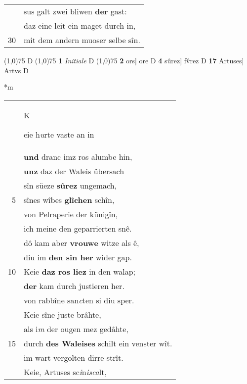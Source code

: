 \documentclass[8pt,a4paper,notitlepage]{article}
\begin{document}
\begin{table}[ht]
\begin{minipage}[t]{0.5\linewidth}
\begin{tabular}{rl}
 & sus galt zwei bliwen \textbf{der} gast:\\ 
 & daz eine leit ein maget durch in,\\ 
30 & mit dem andern muoser selbe sîn.\\ 
\end{tabular}
\scriptsize
\line(1,0){75} \newline
D \newline
\line(1,0){75} \newline
\textbf{1} \textit{Initiale} D  \newline
\line(1,0){75} \newline
\textbf{2} ors] ore D \textbf{4} sûrez] fv̂rez D \textbf{17} Artuses] Artvs D \newline
\end{minipage}
\hspace{0.5cm}
\begin{minipage}[t]{0.5\linewidth}
\small
\begin{center}*m
\end{center}
\begin{tabular}{rl}
 & \begin{large}K\end{large}eie h\textit{u}rte vaste an in\\ 
 & \textbf{und} dranc imz ros alumbe hin,\\ 
 & \textbf{unz} daz der Waleis übersach\\ 
 & sîn süeze \textbf{sûrez} ungemach,\\ 
5 & sînes wîbes \textbf{glîchen} schîn,\\ 
 & von Pelraperie der künigîn,\\ 
 & ich meine den geparrierten snê.\\ 
 & dô kam aber \textbf{vrouwe} witze als ê,\\ 
 & diu im \textbf{den sin her} wider gap.\\ 
10 & Keie \textbf{daz ros liez} in den walap;\\ 
 & \textbf{der} kam durch justieren her.\\ 
 & von rabbîne san\textit{c}ten si diu sper.\\ 
 & Keie sîne juste brâhte,\\ 
 & als i\textit{m} der ougen mez gedâhte,\\ 
15 & durch \textbf{des Waleises} schilt ein venster wît.\\ 
 & im wart vergolten dirre strît.\\ 
 & Keie, Artuses sc\textit{i}n\textit{isca}lt,\\ 

\end{tabular}
\end{minipage}
\end{table}
\end{document}
